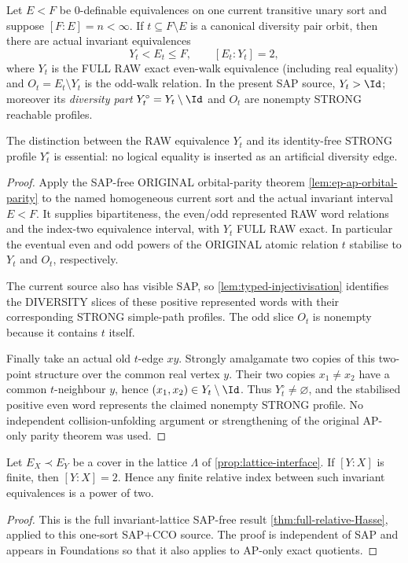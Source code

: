 \begin{theorem}\label{thm:orbital-parity}
Let $E<F$ be $0$-definable equivalences on one current
transitive unary sort and suppose $[F:E]=n<\infty$.
If $t\subseteq F\setminus E$ is a canonical diversity
pair orbit, then there are actual invariant equivalences
\[
 Y_t<E_t\leq F,\qquad [E_t:Y_t]=2,
\]
where $Y_t$ is the FULL RAW exact even-walk equivalence
(including real equality) and
$O_t=E_t\setminus Y_t$ is the odd-walk relation.
In the present SAP source, $Y_t>\Id$; moreover its
\emph{diversity part} $Y_t^\circ=Y_t\setminus\Id$
and $O_t$ are nonempty STRONG reachable profiles.

The distinction between the RAW equivalence $Y_t$
and its identity-free STRONG profile $Y_t^\circ$
is essential: no logical equality is inserted as
an artificial diversity edge.
\end{theorem}
\begin{proof}
Apply the SAP-free ORIGINAL orbital-parity theorem
\cref{lem:ep-ap-orbital-parity} to the named
homogeneous current sort and the actual invariant
interval $E<F$. It supplies bipartiteness, the
even/odd represented RAW word relations and the
index-two equivalence interval, with $Y_t$
FULL RAW exact. In particular the eventual even
and odd powers of the ORIGINAL atomic relation $t$
stabilise to $Y_t$ and $O_t$, respectively.

The current source also has visible SAP, so
\cref{lem:typed-injectivisation} identifies the
DIVERSITY slices of these positive represented
words with their corresponding STRONG
simple-path profiles. The odd slice $O_t$ is
nonempty because it contains $t$ itself.

Finally take an actual old $t$-edge $xy$.
Strongly amalgamate two copies of this
two-point structure over the common real
vertex $y$. Their two copies $x_1\ne x_2$
have a common $t$-neighbour $y$, hence
$(x_1,x_2)\in Y_t\setminus\Id$.
Thus $Y_t^\circ\ne\varnothing$, and the
stabilised positive even word represents
the claimed nonempty STRONG profile.
No independent collision-unfolding argument
or strengthening of the original AP-only
parity theorem was used.
\end{proof}

\begin{theorem}
\label{thm:finite-cover-two}
Let $E_X\prec E_Y$ be a cover in the lattice $\Lambda$ of
\cref{prop:lattice-interface}. If $[Y:X]$ is finite, then
$[Y:X]=2$. Hence any finite relative index between such
invariant equivalences is a power of two.
\end{theorem}
\begin{proof}
This is the full invariant-lattice SAP-free result
\cref{thm:full-relative-Hasse}, applied to this one-sort
SAP+CCO source. The proof is independent of SAP and appears
in Foundations so that it also applies to AP-only exact quotients.
\end{proof}

